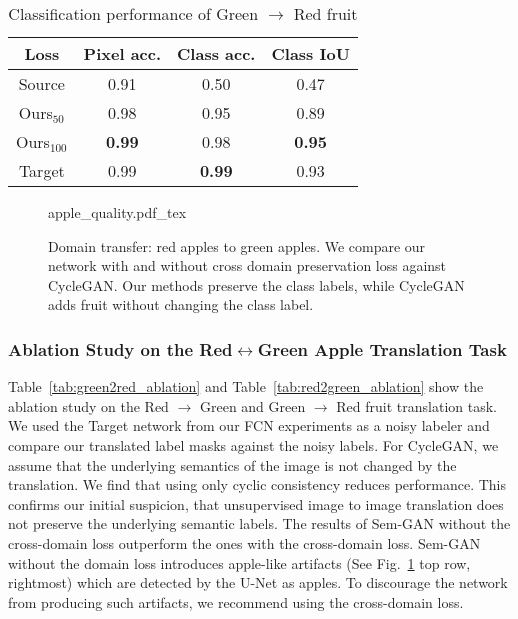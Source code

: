 \begin{table}[!htpb]
    \begin{center}
        \begin{tabular}{c c c c}
            \textbf{Loss} & \textbf{Pixel acc.} & \textbf{Class acc.} & \textbf{Class IoU} \\
            \hline
            Source & 0.91 & 0.50 & 0.47 \\
            Ours$_{50}$ & 0.98 & 0.95 & 0.89\\
            Ours$_{100}$ & \textbf{0.99} & 0.98 & \textbf{0.95}\\
            \hline
            Target & 0.99 & \textbf{0.99} & 0.93  
        \end{tabular}
    \end{center}
    \caption{Classification performance of Green $\to$ Red fruit}
    \label{tab:green2red}
\end{table}

\begin{figure}[!hbpt]
    \centering
    \def\svgwidth{\columnwidth}
    {apple_quality.pdf_tex}
    \caption[Qualitative results on red apples $\leftrightarrow$ green apples]{Domain transfer: red apples to green apples. We compare our network with and without cross domain preservation loss against CycleGAN. Our methods preserve the class labels, while CycleGAN adds fruit without changing the class label.}
    \label{fig:apple_dom_quality}
\end{figure}

\subsubsection{Ablation Study on the Red$\leftrightarrow$Green Apple Translation Task}
 
Table~\ref{tab:green2red_ablation} and Table~\ref{tab:red2green_ablation} show the ablation study on the Red $\to$ Green and Green $\to$ Red fruit translation task. We used the Target network from our FCN experiments as a noisy labeler and compare our translated label masks against the noisy labels. For CycleGAN, we assume that the underlying semantics of the image is not changed by the translation. We find that using only cyclic consistency reduces performance. This confirms our initial suspicion, that unsupervised image to image translation does not preserve the underlying semantic labels. The results of Sem-GAN without the cross-domain loss outperform the ones with the cross-domain loss. Sem-GAN without the domain loss introduces apple-like artifacts (See Fig.~\ref{fig:apple_dom_quality} top row, rightmost) which are detected by the U-Net as apples. To discourage the network from producing such artifacts, we recommend using the cross-domain loss.

